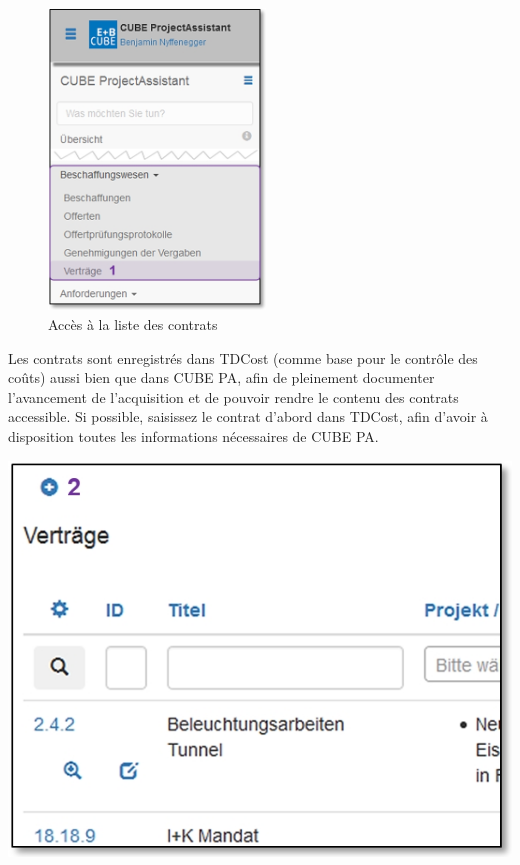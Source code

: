 \begin{figure}
  \vspace{-30pt}      %
  \begin{center}
    \includegraphics[height=80mm]{../chapters/07_Beschaffungswesen/pictures/7-1-8_Menu_Besch_Vertraege.jpg}
  \end{center}
  \vspace{-20pt}
  \caption{Accès à la liste des contrats}
  \vspace{-10pt}
\end{figure}

Les contrats sont enregistrés dans TDCost (comme base pour le contrôle des coûts) aussi bien que dans CUBE PA, afin de pleinement documenter l'avancement de l'acquisition et de pouvoir rendre le contenu des contrats accessible. Si possible, saisissez le contrat d'abord dans TDCost, afin d'avoir à disposition toutes les informations 
nécessaires de CUBE PA.

\begin{center}
\hspace{-55mm}   
\includegraphics[width=.4\linewidth]{../chapters/07_Beschaffungswesen/pictures/7-1-8_NeuerVertrag.jpg}
\end{center}

\vspace{\baselineskip}

